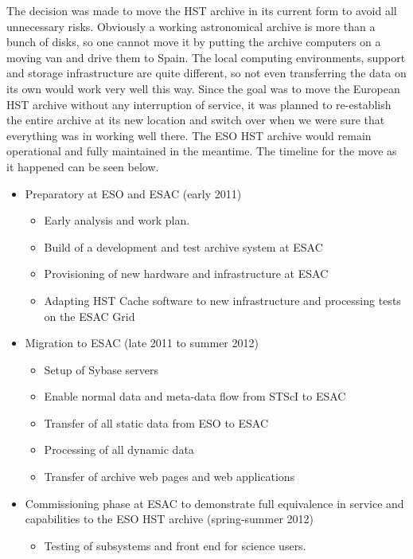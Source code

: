 \documentclass[11pt,twoside]{article}  %
\begin{document}
The decision was made to move the HST archive in its current form to avoid all unnecessary risks.
Obviously a working astronomical archive is more than a bunch of disks, so one cannot move it  by putting the archive computers  on a moving van and drive them to Spain.
The local computing environments, support and storage infrastructure are quite different, so not even transferring the data on its own would work very well this way.
Since the goal was to move the European HST archive without any interruption of service, it was planned to re-establish the entire archive at its new location and switch over when we were sure that everything was in working well there. The ESO HST archive would remain operational and fully maintained in the meantime. 
The timeline for the move as it happened can be seen below.

\begin{itemize} \itemsep0pt \parskip0pt 
\item Preparatory at ESO and ESAC (early 2011) 
 \begin{itemize} \itemsep0pt \parskip0pt 
  \item Early analysis and work plan.
  \item Build of a development and test archive system at ESAC
  \item Provisioning of new hardware and infrastructure at ESAC
  \item Adapting HST Cache software  to new infrastructure and processing tests on the ESAC Grid  
  \end{itemize}
\item Migration to ESAC (late 2011 to  summer 2012)
  \begin{itemize} \itemsep0pt \parskip0pt 
  \item Setup of Sybase servers  
   \item Enable normal data and meta-data flow from STScI to ESAC
  \item Transfer of all static data from ESO to ESAC
  \item Processing of all dynamic data
  \item Transfer of archive web pages and web applications
  \end{itemize}
\item Commissioning phase at ESAC to demonstrate full equivalence in service and capabilities to the ESO HST archive (spring-summer 2012)
\begin{itemize} \itemsep0pt \parskip0pt 
\item Testing of subsystems and front end for science users. 

\end{itemize}
\end{itemize}
\end{document}
